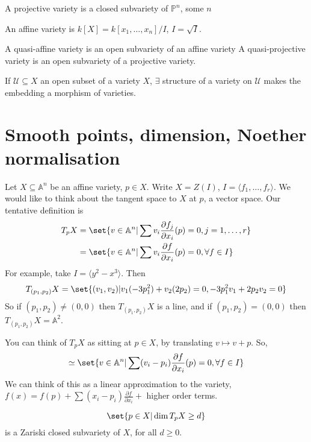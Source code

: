\documentclass{article}
\newcommand{\A}{\mathbb{A}}
\newcommand{\proj}{\mathbb{P}}
\begin{document}
\begin{defi}
    A projective variety is a closed subvariety of $\proj^n$, some $n$
\end{defi}
An affine variety is $k[X] = k[x_1, \dotsc, x_n]/I$, $I = \sqrt{I}$.
\begin{defi}
    A quasi-affine variety is an open subvariety of an affine variety
    A quasi-projective variety is an open subvariety of a projective variety.
\end{defi}
\begin{ex}If $\mathcal{U} \subseteq X$ an open subset of a variety $X$, $\exists$ structure of a variety on $\mathcal{U}$ makes the embedding a morphism of varieties.
\end{ex}

\section{Smooth points, dimension, Noether normalisation}
Let $X \subseteq \A^n$ be an affine variety, $p \in X$. Write $X = Z(I)$, $I = \langle f_1, \dotsc, f_r \rangle$.
We would like to think about the tangent space to $X$ at $p$, a vector space.
Our tentative definition is
\begin{align*}
    T_p X &= \set{v \in \A^n | \sum v_i \frac{\partial f_j}{\partial x_i}(p) = 0, j = 1,\dotsc, r} \\
    &= \set{v \in \A^n | \sum v_i \frac{\partial f}{\partial x_i}(p) = 0, \forall f \in I}
\end{align*}
For example, take $I = \langle y^2 - x^3 \rangle$.
Then
\begin{equation*}
    T_{(p_1, p_2)} X = \set{(v_1, v_2) | v_1 (-3p_1^2) + v_2 (2 p_2) = 0, -3p_1^2 v_1 + 2p_2 v_2 = 0}
\end{equation*}
So if $(p_1, p_2) \neq (0, 0)$ then $T_{(p_1, p_2)} X$ is a line, and if $(p_1, p_2) = (0, 0)$ then $T_{(p_1, p_2)} X = \A^2$.
\begin{remark}
    You can think of $T_p X$ as sitting at $p \in X$, by translating $v \mapsto v + p$.
    So,
    \begin{equation*}
        \simeq \set{v \in \A^n | \sum (v_i - p_i) \frac{\partial f}{\partial x_i} (p) = 0, \forall f \in I}
    \end{equation*}
    We can think of this as a linear approximation to the variety, $f(x) = f(p) + \sum (x_i - p_i) \frac{\partial f}{\partial x_i} + $ higher order terms.
\end{remark}
\begin{lemma}
    \begin{equation*}
        \set{p \in X | \dim T_p X \geq d}
    \end{equation*}
    is a Zariski closed subvariety of $X$, for all $d \geq 0$.
\end{lemma}
\end{document}
